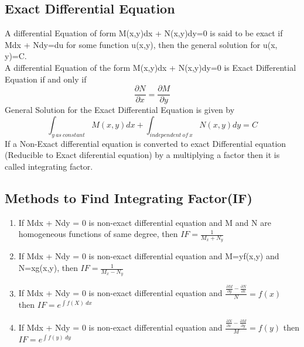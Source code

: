 \subsection{Exact Differential Equation}
A differential Equation of form M(x,y)dx + N(x,y)dy=0 is said to be exact if Mdx + Ndy=du for some function u(x,y), then the general solution for u(x, y)=C.\vspace{0.2cm}\\
A differential Equation of the form M(x,y)dx + N(x,y)dy=0 is Exact Differential Equation if and only if
\[\frac{\partial N}{\partial x}=\frac{\partial M}{\partial y}\]
General Solution for the Exact Differential Equation is given by
\[\int_{y\ as\ constant}M(x,y)dx + \int_{independent\ of\ x}N(x,y)dy=C\]
If a Non-Exact differential equation is converted to exact Differential equation (Reducible to Exact diferential equation) by a multiplying a factor then it is called integrating factor.

\subsection*{Methods to Find Integrating Factor(IF)}
\begin{enumerate}
    \item If Mdx + Ndy = 0 is non-exact differential equation and M and N are homogeneous functions of same degree, then \(IF=\frac{1}{M_x+N_y}\)
    \item If Mdx + Ndy = 0 is non-exact differential equation and M=yf(x,y) and N=xg(x,y), then \(IF=\frac{1}{M_x-N_y}\)
    \item If Mdx + Ndy = 0 is non-exact differential equation and \(\frac{\frac{\partial M}{\partial y}-\frac{\partial N}{\partial x}}{N}=f(x)\) then \(IF=e^{\int f(X)\ dx}\)
    \item If Mdx + Ndy = 0 is non-exact differential equation and \(\frac{\frac{\partial N}{\partial x}-\frac{\partial M}{\partial y}}{M}=f(y)\) then \(IF=e^{\int f(y)\ dy}\)
\end{enumerate}


